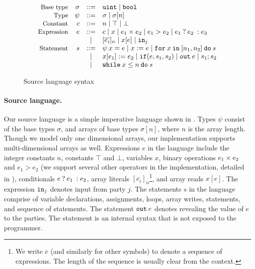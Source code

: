 \begin{figure}[htp]
  \footnotesize
  \[
  \begin{array}{rrcl}
    \text{\small{Base type}} & \sigma &::=& {\mathtt{uint}} \mid {\ensuremath{\mathtt{bool}}}\\
    \text{\small{Type}} & \psi &::=& \sigma \mid \sigma[n]\\
    \text{\small{Constant}} & c &::=& n \mid \top \mid \bot\\
    \text{\small{Expression}} & e &::=& c \mid x \mid e_{1} \times e_{2} \mid e_{1} > e_{2} \mid {{e_{1}}\:?\:{e_{2}}\::{e_{3}}}\\
    & &\mid& [\overline{e_{i}}]_{n} \mid x[e] \mid {\ensuremath{\mathtt{in}}}_{j}\\
    \text{\small{Statement}} & s &::=& \psi\:x = e \mid x := e \mid {\ensuremath{\mathtt{for}}}\:{x}\:{\mathtt{in}}\:[{n_{1}}, {n_{2}}]\:{\mathtt{do}}\:{s}\\
    & & \mid& x[e_{1}] := e_{2} \mid {\ensuremath{\mathtt{if}}}({e}, {s_{1}}, {s_{2}}) \mid {\ensuremath{\mathtt{out}}}\:e \mid s_{1}; s_{2}\\
    & & \mid& {\mathtt{while}}\:{x} \leq {n}\:{\mathtt{do}}\:{s}
  \end{array}
  \]
\caption{Source language syntax}
\label{fig:srclang}
\end{figure}
\vspace{-0.1in}
\paragraph{Source language.} Our source language
 is a simple imperative language shown in . Types
$\psi$ consist of the base types $\sigma$, and arrays
of base types $\sigma[n]$, where $n$ is the array length. Though we
model only one dimensional arrays, our implementation supports
 multi-dimensional arrays as well. Expressions $e$ in the language include the
 integer constants $n$,  constants $\top$ and $\bot$,
variables $x$, binary operations $e_{1} \times e_{2}$ and $e_{1} >
e_{2}$ (we support several other
operators in the implementation, detailed in ),
conditionals ${{e}\:?\:{e_{1}}\::{e_{2}}}$,
array literals
$[\overline{e_{i}}]_{n}$\footnote{We write $\overline{e}$ (and
  similarly for other symbols) to denote a sequence of expressions.
The length of the sequence is usually clear from the context.}, and
array reads $x[e]$. The expression ${\mathtt{in}}_{j}$ denotes input from
party $j$. The statements $s$ in the language comprise of variable
declarations, assignments,
 loops, array writes, 
statements, and sequence of statements. The statement
${\mathtt{out}}\:e$ denotes revealing the value of $e$ to the
parties. The  statement is an internal syntax that is not
exposed to the programmer. \\

